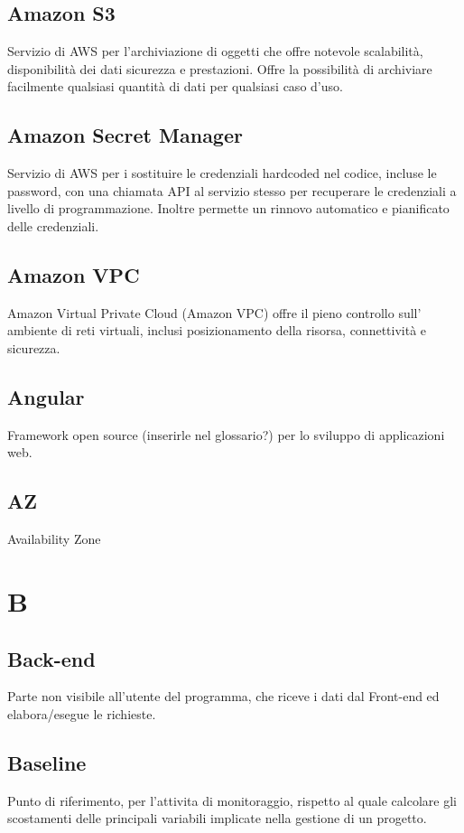 \documentclass{classes/base}
\begin{document}
        \subsection*{Amazon S3}
        \label{sec:S3}
        Servizio di AWS per l'archiviazione di oggetti che offre notevole scalabilità, disponibilità dei dati sicurezza e prestazioni. Offre la possibilità di archiviare facilmente qualsiasi quantità di dati per qualsiasi caso d'uso.
        
        \subsection*{Amazon Secret Manager}
        Servizio di AWS per i sostituire le credenziali hardcoded nel codice, incluse le password, con una chiamata API al servizio stesso per recuperare le credenziali a livello di programmazione. Inoltre permette un rinnovo automatico e pianificato delle credenziali.

        \subsection*{Amazon VPC}
        Amazon Virtual Private Cloud (Amazon VPC) offre il pieno controllo sull' ambiente di reti virtuali, inclusi posizionamento della risorsa, connettività e sicurezza.

        \subsection*{Angular} 
        Framework open source (inserirle nel glossario?) per lo sviluppo di applicazioni web.

        \subsection*{AZ}
        Availability Zone
    
        \newpage  
    \section{B}
    
    	\subsection*{Back-end}
    	Parte non visibile all'utente del programma, che riceve i dati dal Front-end ed elabora/esegue le richieste.
    
    	\subsection*{Baseline}
    	Punto di riferimento, per l'attivita di monitoraggio, rispetto al quale calcolare gli scostamenti delle principali variabili implicate nella gestione di un progetto.
        
\end{document}
